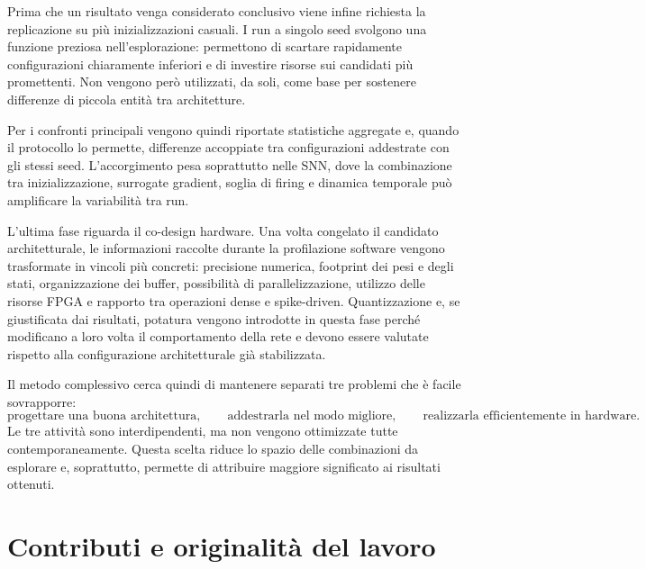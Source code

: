 Prima che un risultato venga considerato conclusivo viene infine richiesta la replicazione su più inizializzazioni casuali. I run a singolo seed svolgono una funzione preziosa nell'esplorazione: permettono di scartare rapidamente configurazioni chiaramente inferiori e di investire risorse sui candidati più promettenti. Non vengono però utilizzati, da soli, come base per sostenere differenze di piccola entità tra architetture.

Per i confronti principali vengono quindi riportate statistiche aggregate e, quando il protocollo lo permette, differenze accoppiate tra configurazioni addestrate con gli stessi seed. L'accorgimento pesa soprattutto nelle SNN, dove la combinazione tra inizializzazione, surrogate gradient, soglia di firing e dinamica temporale può amplificare la variabilità tra run.

L'ultima fase riguarda il co-design hardware. Una volta congelato il candidato architetturale, le informazioni raccolte durante la profilazione software vengono trasformate in vincoli più concreti: precisione numerica, footprint dei pesi e degli stati, organizzazione dei buffer, possibilità di parallelizzazione, utilizzo delle risorse FPGA e rapporto tra operazioni dense e spike-driven. Quantizzazione e, se giustificata dai risultati, potatura vengono introdotte in questa fase perché modificano a loro volta il comportamento della rete e devono essere valutate rispetto alla configurazione architetturale già stabilizzata.

Il metodo complessivo cerca quindi di mantenere separati tre problemi che è facile sovrapporre:
\begin{equation}
\label{eq:tre_problemi_separati}
\text{progettare una buona architettura}, \qquad \text{addestrarla nel modo migliore}, \qquad \text{realizzarla efficientemente in hardware}.
\end{equation}
Le tre attività sono interdipendenti, ma non vengono ottimizzate tutte contemporaneamente. Questa scelta riduce lo spazio delle combinazioni da esplorare e, soprattutto, permette di attribuire maggiore significato ai risultati ottenuti.




\section{Contributi e originalità del lavoro}
\label{sec:contributi_originalita}

